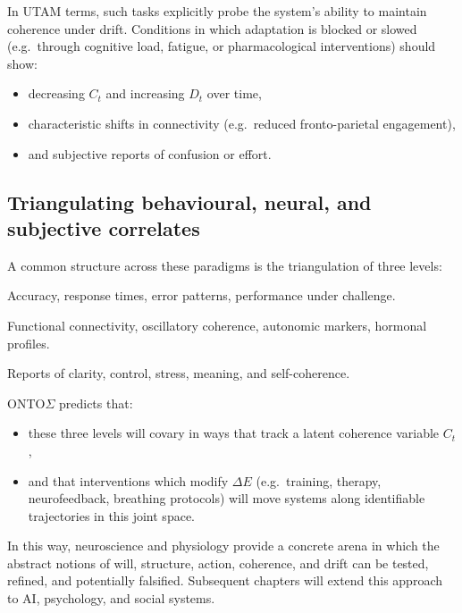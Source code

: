 \documentclass[12pt,a4paper]{report}
\begin{document}
In UTAM terms, such tasks explicitly probe the system's ability to maintain coherence under drift. Conditions in which adaptation is blocked or slowed (e.g.\ through cognitive load, fatigue, or pharmacological interventions) should show:

\begin{itemize}[leftmargin=2em]
    \item decreasing \(C_t\) and increasing \(D_t\) over time,
    \item characteristic shifts in connectivity (e.g.\ reduced fronto-parietal engagement),
    \item and subjective reports of confusion or effort.
\end{itemize}

\subsection*{Triangulating behavioural, neural, and subjective correlates}

A common structure across these paradigms is the triangulation of three levels:

\begin{description}[leftmargin=2em]
    \item[Behavioural.] Accuracy, response times, error patterns, performance under challenge.
    \item[Neural/physiological.] Functional connectivity, oscillatory coherence, autonomic markers, hormonal profiles.
    \item[Subjective.] Reports of clarity, control, stress, meaning, and self-coherence.
\end{description}

ONTO$\Sigma$ predicts that:

\begin{itemize}[leftmargin=2em]
    \item these three levels will covary in ways that track a latent coherence variable \(C_t\),
    \item and that interventions which modify $\Delta E$ (e.g.\ training, therapy, neurofeedback, breathing protocols) will move systems along identifiable trajectories in this joint space.
\end{itemize}

In this way, neuroscience and physiology provide a concrete arena in which the abstract notions of will, structure, action, coherence, and drift can be tested, refined, and potentially falsified. Subsequent chapters will extend this approach to AI, psychology, and social systems.
\end{document}
